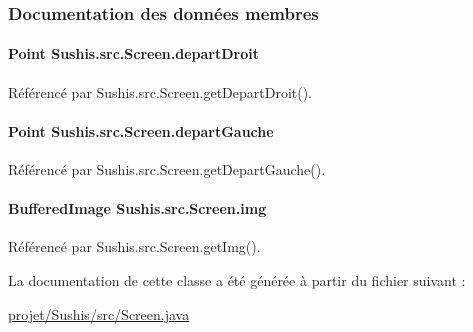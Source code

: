 \subsubsection{Documentation des données membres}
\hypertarget{classSushis_1_1src_1_1Screen_a47ce555aa58251254ba6d5b76b857ab7}{}
\paragraph[{depart\+Droit}]{\setlength{\rightskip}{0pt plus 5cm}Point Sushis.\+src.\+Screen.\+depart\+Droit\hspace{0.3cm}{\ttfamily [private]}}\label{classSushis_1_1src_1_1Screen_a47ce555aa58251254ba6d5b76b857ab7}


Référencé par Sushis.\+src.\+Screen.\+get\+Depart\+Droit().

\hypertarget{classSushis_1_1src_1_1Screen_a9b2270f51a183da24cf6f89d05a46991}{}
\paragraph[{depart\+Gauche}]{\setlength{\rightskip}{0pt plus 5cm}Point Sushis.\+src.\+Screen.\+depart\+Gauche\hspace{0.3cm}{\ttfamily [private]}}\label{classSushis_1_1src_1_1Screen_a9b2270f51a183da24cf6f89d05a46991}


Référencé par Sushis.\+src.\+Screen.\+get\+Depart\+Gauche().

\hypertarget{classSushis_1_1src_1_1Screen_ae3beed4f3d5e1570d216d186f7dee4a7}{}
\paragraph[{img}]{\setlength{\rightskip}{0pt plus 5cm}Buffered\+Image Sushis.\+src.\+Screen.\+img\hspace{0.3cm}{\ttfamily [private]}}\label{classSushis_1_1src_1_1Screen_ae3beed4f3d5e1570d216d186f7dee4a7}


Référencé par Sushis.\+src.\+Screen.\+get\+Img().



La documentation de cette classe a été générée à partir du fichier suivant \+:\begin{DoxyCompactItemize}
\item 
\hyperlink{projet_2Sushis_2src_2Screen_8java}{projet/\+Sushis/src/\+Screen.\+java}\end{DoxyCompactItemize}
